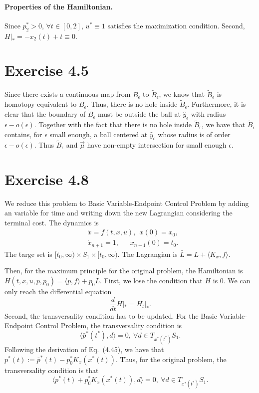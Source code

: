 \documentclass[11pt]{report}
\begin{document}
\paragraph{Properties of the Hamiltonian.} Since $p_2^* > 0$, $\forall t \in [0,2]$, $u^* \equiv 1$ satisfies the maximization condition. Second, $H|_* = -x_2(t) + t \equiv 0$.
\section*{Exercise 4.5}
Since there exists a continuous map from $B_\epsilon$ to $\tilde{B}_\epsilon$, we know that $\tilde{B}_\epsilon$ is homotopy-equivalent to $B_\epsilon$. Thus, there is no hole inside $\tilde{B}_\epsilon$. Furthermore, it is clear that the boundary of $\tilde{B}_\epsilon$ must be outside the ball at $\hat{y}_\epsilon$ with radius $\epsilon - o(\epsilon)$. Together with the fact that there is no hole inside $\tilde{B}_\epsilon$, we have that $\tilde{B}_\epsilon$ contains, for $\epsilon$ small enough, a ball centered at $\hat{y}_\epsilon$ whose radius is of order $\epsilon - o(\epsilon)$. Thus $\tilde{B}_\epsilon$ and $\overrightarrow{\mu}$ have non-empty intersection for small enough $\epsilon$.

\section*{Exercise 4.8}
We reduce this problem to Basic Variable-Endpoint Control Problem by adding an variable for time and writing down the new Lagrangian considering the terminal cost. The dynamics is
\begin{align*}
& \dot{x} = f(t, x, u),~~ x(0) = x_0,\\
& \dot{x}_{n+1} = 1,~~~~~~~ x_{n+1}(0) = t_0.
\end{align*}
The targe set is $[t_0, \infty) \times S_1 \times [t_0, \infty)$. The Lagrangian is $\bar{L} = L+\langle K_x, f \rangle$.

Then, for the maximum principle for the original problem, the Hamiltonian is $H(t,x,u,p,p_0) = \langle p, f \rangle + p_0 L$. First, we lose the condition that $H$ is $0$. We can only reach the differential equation 
\[
\frac{d}{dt} H|_* = H_t|_*.
\] Second, the transversality condition has to be updated. For the Basic Variable-Endpoint Control Problem, the transversality condition is
\[
\langle \bar{p}^*(t^*), d \rangle = 0, ~\forall d \in T_{x^*(t^*)}S_1.
\]
Following the derivation of Eq.~(4.45), we have that $p^*(t) := \bar{p}^*(t) - p_0^* K_x(x^*(t))$.
Thus, for the original problem, the transversality condition is that
\[
\langle p^*(t)+p_0^* K_x(x^*(t)), d \rangle = 0, ~\forall d \in T_{x^*(t^*)}S_1.
\]
\end{document}

